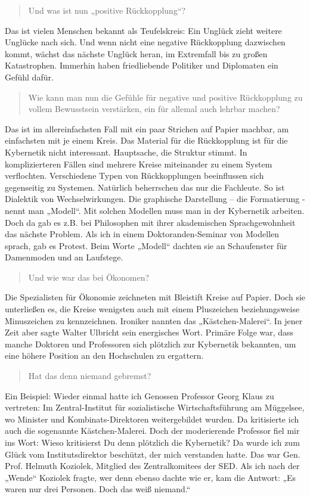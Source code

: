 \documentclass[11pt,a4paper]{article}
\newenvironment{frage}{\begin{quote}}{\end{quote}}
\begin{document}
\begin{frage}
  Und was ist nun „positive Rückkopplung“? 
\end{frage}
Das ist vielen Menschen bekannt als Teufelskreis: Ein Unglück zieht weitere
Unglücke nach sich. Und wenn nicht eine negative Rückkopplung dazwischen
kommt, wächst das nächste Unglück heran, im Extremfall bis zu großen
Katastrophen. Immerhin haben friedliebende Politiker und Diplomaten ein Gefühl
dafür.

\begin{frage}
  Wie kann man nun die Gefühle für negative und positive Rückkopplung zu
  vollem Bewusstsein verstärken, ein für allemal auch lehrbar machen?
\end{frage}
Das ist im allereinfachsten Fall mit ein paar Strichen auf Papier machbar, am
einfachsten mit je einem Kreis. Das Material für die Rückkopplung ist für die
Kybernetik nicht interessant. Hauptsache, die Struktur stimmt. In
komplizierteren Fällen sind mehrere Kreise miteinander zu einem System
verflochten. Verschiedene Typen von Rückkopplungen beeinflussen sich
gegenseitig zu Systemen. Natürlich beherrschen das nur die Fachleute. So ist
Dialektik von Wechselwirkungen. Die graphische Darstellung – die Formatierung
- nennt man „Modell“. Mit solchen Modellen muss man in der Kybernetik
arbeiten. Doch da gab es z.B. bei Philosophen mit ihrer akademischen
Sprachgewohnheit das nächste Problem. Als ich in einem Doktoranden-Seminar von
Modellen sprach, gab es Protest. Beim Worte „Modell“ dachten sie an
Schaufenster für Damenmoden und an Laufstege.

\begin{frage}
  Und wie war das bei Ökonomen?
\end{frage}
Die Spezialisten für Ökonomie zeichneten mit Bleistift Kreise auf Papier. Doch
sie unterließen es, die Kreise wenigsten auch mit einem Pluszeichen
beziehungsweise Minuszeichen zu kennzeichnen. Ironiker nannten das
„Kästchen-Malerei“. In jener Zeit aber sagte Walter Ulbricht sein energisches
Wort. Primäre Folge war, dass manche Doktoren und Professoren sich plötzlich
zur Kybernetik bekannten, um eine höhere Position an den Hochschulen zu
ergattern.

\begin{frage}
  Hat das denn niemand gebremst?
\end{frage}
Ein Beispiel: Wieder einmal hatte ich Genossen Professor Georg Klaus zu
vertreten: Im Zentral-Institut für sozialistische Wirtschaftsführung am
Müggelsee, wo Minister und Kombi\-nats-Direktoren weitergebildet wurden. Da
kritisierte ich auch die sogenannte Kästchen-Malerei. Doch der moderierende
Professor fiel mir ins Wort: Wieso kritisierst Du denn plötzlich die
Kybernetik? Da wurde ich zum Glück vom Institutsdirektor beschützt, der mich
verstanden hatte. Das war Gen. Prof. Helmuth Koziolek, Mitglied des
Zentralkomitees der SED. Als ich nach der „Wende“ Koziolek fragte, wer denn
ebenso dachte wie er, kam die Antwort: „Es waren nur drei Personen. Doch das
weiß niemand.“
\end{document}
